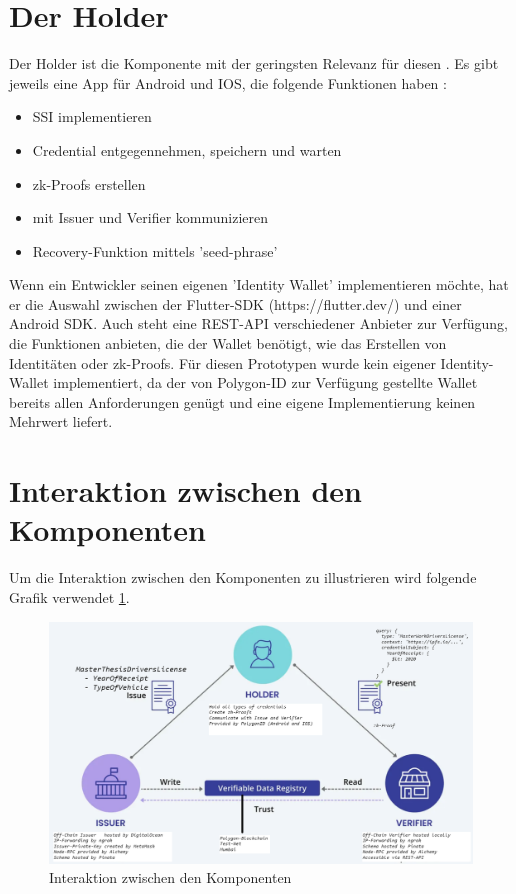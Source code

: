\section{Der Holder}
Der Holder ist die Komponente mit der geringsten Relevanz für diesen . Es gibt jeweils eine App für Android und IOS, die folgende Funktionen haben \cite{ID58}:
\begin{itemize}
	\item SSI implementieren
	\item Credential entgegennehmen, speichern und warten
	\item zk-Proofs erstellen
	\item mit Issuer und Verifier kommunizieren
	\item Recovery-Funktion mittels 'seed-phrase'
\end{itemize}

Wenn ein Entwickler seinen eigenen 'Identity Wallet' implementieren möchte, hat er die Auswahl zwischen der Flutter-SDK (https://flutter.dev/) und einer Android SDK. Auch steht eine REST-API verschiedener Anbieter zur Verfügung, die Funktionen anbieten, die der Wallet benötigt, wie das Erstellen von Identitäten oder zk-Proofs.
Für diesen Prototypen wurde kein eigener Identity-Wallet implementiert, da der von Polygon-ID zur Verfügung gestellte Wallet bereits allen Anforderungen genügt und eine eigene Implementierung keinen Mehrwert liefert.

\section{Interaktion zwischen den Komponenten}
Um die Interaktion zwischen den Komponenten zu illustrieren wird folgende Grafik verwendet \ref{fig:trust}.

\begin{figure}[H]
	\centering
	\includegraphics[scale=0.4]{media/trust}
	\caption{Interaktion zwischen den Komponenten \cite{ID63}}
	\label{fig:trust}
\end{figure}

